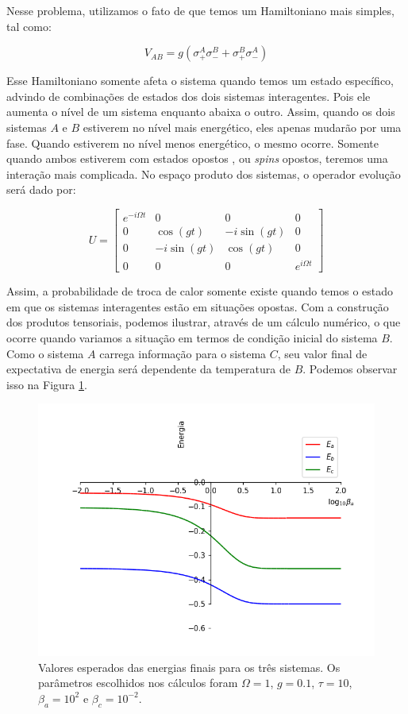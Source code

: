Nesse problema, utilizamos o fato de que temos um Hamiltoniano mais simples, tal como:

\begin{equation}
V_{AB} = g\left( \sigma_{+}^{A} \sigma_{-}^{B} + \sigma_{+}^{B} \sigma_{-}^{A} \right) 
\end{equation}

Esse Hamiltoniano somente afeta o sistema quando temos um estado específico, advindo de combinações de estados dos dois sistemas interagentes. Pois ele aumenta o nível de um sistema enquanto abaixa o outro. Assim, quando os dois sistemas $A$ e $B$ estiverem no nível mais energético, eles apenas mudarão por uma fase. Quando estiverem no nível menos energético, o mesmo ocorre. Somente quando ambos estiverem com estados opostos , ou \textit{spins} opostos, teremos uma interação mais complicada. No espaço produto dos sistemas, o operador evolução será dado por:

\begin{equation}
U = \left[\begin{matrix}e^{- i \Omega t} & 0 & 0 & 0\\0 & \cos{\left (g t \right )} & - i \sin{\left (g t \right )} & 0\\0 & - i \sin{\left (g t \right )} & \cos{\left (g t \right )} & 0\\0 & 0 & 0 & e^{i \Omega t}\end{matrix}\right]
\end{equation}

Assim, a probabilidade de troca de calor somente existe quando temos o estado em que os sistemas interagentes estão em situações opostas. Com a construção dos produtos tensoriais, podemos ilustrar, através de um cálculo numérico, o que ocorre quando variamos a situação em termos de condição inicial do sistema $B$. Como o sistema $A$ carrega informação para o sistema $C$, seu valor final de expectativa de energia será dependente da temperatura de $B$. Podemos observar isso na Figura \ref{energias_bb_2}.

\begin{figure}[!h]
\includegraphics[scale=.45]{Content/energias_bb_2.png}
\caption{Valores esperados das energias finais para os três sistemas. Os parâmetros escolhidos nos cálculos foram $\Omega=1$, $g=0.1$, $\tau=10$,$\beta_a=10^2$ e $\beta_c=10^{-2}$.}
\label{energias_bb_2}
\end{figure}